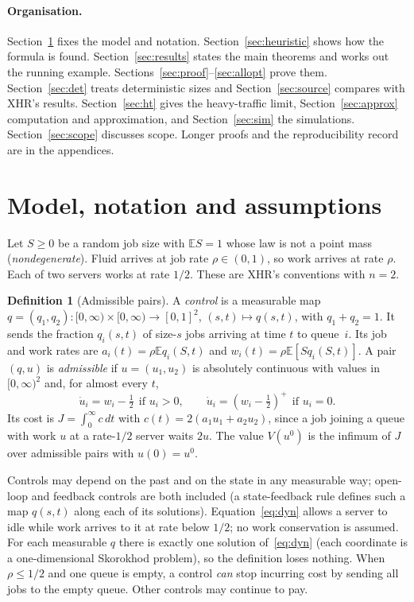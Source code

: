 \documentclass[11pt]{article}
\numberwithin{equation}{section}
\theoremstyle{definition}
\newtheorem{definition}[theorem]{Definition}
\theoremstyle{remark}
\newcommand{\E}{\mathbb{E}}
\begin{document}
\paragraph{Organisation.} Section~\ref{sec:model} fixes the model and notation. Section~\ref{sec:heuristic} shows how the formula is found. Section~\ref{sec:results} states the main theorems and works out the running example. Sections~\ref{sec:proof}--\ref{sec:allopt} prove them. Section~\ref{sec:det} treats deterministic sizes and Section~\ref{sec:source} compares with XHR's results. Section~\ref{sec:ht} gives the heavy-traffic limit, Section~\ref{sec:approx} computation and approximation, and Section~\ref{sec:sim} the simulations. Section~\ref{sec:scope} discusses scope. Longer proofs and the reproducibility record are in the appendices.

\section{Model, notation and assumptions}\label{sec:model}

Let $S\ge0$ be a random job size with $\E S=1$ whose law is not a point mass (\emph{nondegenerate}). Fluid arrives at job rate $\rho\in(0,1)$, so work arrives at rate $\rho$. Each of two servers works at rate $1/2$. These are XHR's conventions with $n=2$.

\begin{definition}[Admissible pairs]\label{def:admissible}
A \emph{control} is a measurable map $q=(q_1,q_2):[0,\infty)\times[0,\infty)\to[0,1]^2$, $(s,t)\mapsto q(s,t)$, with $q_1+q_2=1$. It sends the fraction $q_i(s,t)$ of size-$s$ jobs arriving at time $t$ to queue~$i$. Its job and work rates are $a_i(t)=\rho\E q_i(S,t)$ and $w_i(t)=\rho\E[Sq_i(S,t)]$. A pair $(q,u)$ is \emph{admissible} if $u=(u_1,u_2)$ is absolutely continuous with values in $[0,\infty)^2$ and, for almost every $t$,
\begin{equation}\label{eq:dyn}
\dot u_i=w_i-\tfrac12\ \ \text{if } u_i>0,\qquad \dot u_i=(w_i-\tfrac12)^+\ \ \text{if } u_i=0.
\end{equation}
Its cost is $J=\int_0^\infty c\,dt$ with $c(t)=2(a_1u_1+a_2u_2)$, since a job joining a queue with work $u$ at a rate-$1/2$ server waits $2u$. The value $V(u^0)$ is the infimum of $J$ over admissible pairs with $u(0)=u^0$.
\end{definition}

Controls may depend on the past and on the state in any measurable way; open-loop and feedback controls are both included (a state-feedback rule defines such a map $q(s,t)$ along each of its solutions). Equation~\eqref{eq:dyn} allows a server to idle while work arrives to it at rate below $1/2$; no work conservation is assumed. For each measurable $q$ there is exactly one solution of~\eqref{eq:dyn} (each coordinate is a one-dimensional Skorokhod problem), so the definition loses nothing. When $\rho\le1/2$ and one queue is empty, a control \emph{can} stop incurring cost by sending all jobs to the empty queue. Other controls may continue to pay.
\end{document}
